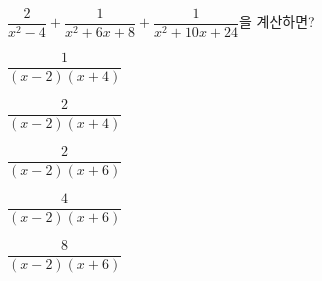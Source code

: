 \hspace*{2mm}\begin{minipage}[t]{\dimexpr\linewidth-2mm\relax}\vspace{0pt}
$\dfrac{2}{x^2-4}+\dfrac{1}{x^2+6x+8}+\dfrac{1}{x^2+10x+24}$을 계산하면?
\begin{choicesii}{\rule[-3ex]{0pt}{8ex}$\dfrac{1}{(x-2)(x+4)}$}{\rule[-3ex]{0pt}{8ex}$\dfrac{2}{(x-2)(x+4)}$}{\rule[-3ex]{0pt}{8ex}$\dfrac{2}{(x-2)(x+6)}$}{\rule[-3ex]{0pt}{8ex}$\dfrac{4}{(x-2)(x+6)}$}{\rule[-3ex]{0pt}{8ex}$\dfrac{8}{(x-2)(x+6)}$}\end{choicesii}\end{minipage}
